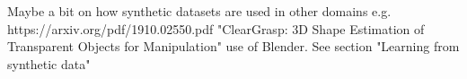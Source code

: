 













Maybe a bit on how synthetic datasets are used in other domains e.g. https://arxiv.org/pdf/1910.02550.pdf "ClearGrasp:
3D Shape Estimation of Transparent Objects for Manipulation" use of Blender. See section "Learning from synthetic data"

